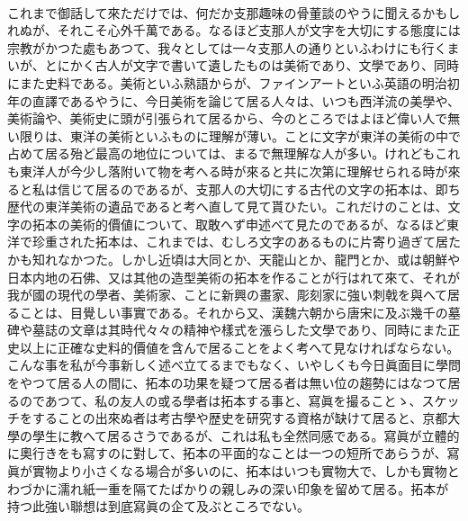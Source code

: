 \documentclass[8pt]{extreport}
\begin{document}
\begin{CJK}{UTF8}{min}
\\	これまで御話して來ただけでは、何だか支那趣味の骨董談のやうに聞えるかもしれぬが、それこそ心外千萬である。なるほど支那人が文字を大切にする態度には宗教がかつた處もあつて、我々としては一々支那人の通りといふわけにも行くまいが、とにかく古人が文字で書いて遺したものは美術であり、文學であり、同時にまた史料である。美術といふ熟語からが、ファインアートといふ英語の明治初年の直譯であるやうに、今日美術を論じて居る人々は、いつも西洋流の美學や、美術論や、美術史に頭が引張られて居るから、今のところではよほど偉い人で無い限りは、東洋の美術といふものに理解が薄い。ことに文字が東洋の美術の中で占めて居る殆ど最高の地位については、まるで無理解な人が多い。けれどもこれも東洋人が今少し落附いて物を考へる時が來ると共に次第に理解せられる時が來ると私は信じて居るのであるが、支那人の大切にする古代の文字の拓本は、即ち歴代の東洋美術の遺品であると考へ直して見て貰ひたい。これだけのことは、文字の拓本の美術的價値について、取敢へず申述べて見たのであるが、なるほど東洋で珍重された拓本は、これまでは、むしろ文字のあるものに片寄り過ぎて居たかも知れなかつた。しかし近頃は大同とか、天龍山とか、龍門とか、或は朝鮮や日本内地の石佛、又は其他の造型美術の拓本を作ることが行はれて來て、それが我が國の現代の學者、美術家、ことに新興の畫家、彫刻家に強い刺戟を與へて居ることは、目覺しい事實である。それから又、漢魏六朝から唐宋に及ぶ幾千の墓碑や墓誌の文章は其時代々々の精神や樣式を漲らした文學であり、同時にまた正史以上に正確な史料的價値を含んで居ることをよく考へて見なければならない。こんな事を私が今事新しく述べ立てるまでもなく、いやしくも今日眞面目に學問をやつて居る人の間に、拓本の功果を疑つて居る者は無い位の趨勢にはなつて居るのであつて、私の友人の或る學者は拓本する事と、寫眞を撮ることゝ、スケッチをすることの出來ぬ者は考古學や歴史を研究する資格が缺けて居ると、京都大學の學生に教へて居るさうであるが、これは私も全然同感である。寫眞が立體的に奧行きをも寫すのに對して、拓本の平面的なことは一つの短所であらうが、寫眞が實物より小さくなる場合が多いのに、拓本はいつも實物大で、しかも實物とわづかに濡れ紙一重を隔てたばかりの親しみの深い印象を留めて居る。拓本が持つ此強い聯想は到底寫眞の企て及ぶところでない。

\end{CJK}
\end{document}
